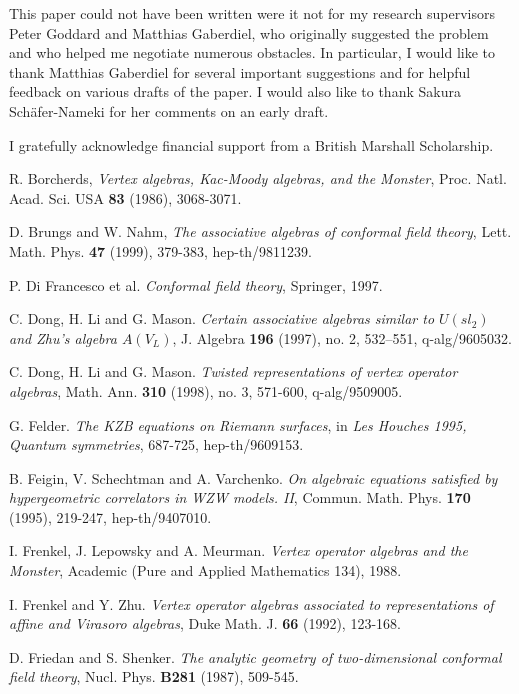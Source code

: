 \documentclass[a4paper,12pt]{article}
\newcommand{\ti}[1]{\textit{#1}}
\begin{document}
This paper could not have been written were it not for my research supervisors Peter Goddard and Matthias Gaberdiel,
who originally suggested the problem and who helped me negotiate numerous obstacles.  In particular, I would like to thank
Matthias Gaberdiel for several important suggestions and for helpful feedback on various drafts of the paper.  I would
also like to thank Sakura Sch\"afer-Nameki for her comments on an early draft.

I gratefully acknowledge financial support from a British Marshall Scholarship.


\begin{thebibliography}{99}

 R. Borcherds, \ti{Vertex algebras, Kac-Moody algebras, and the Monster},
Proc. Natl. Acad. Sci. USA \textbf{83} (1986), 3068-3071.

 D. Brungs and W. Nahm, \ti{The associative algebras of conformal field theory}, Lett. Math. Phys. \textbf{47} (1999), 379-383, hep-th/9811239.

 P. Di Francesco et al.  \ti{Conformal field theory}, Springer, 1997.

 C. Dong, H. Li and G. Mason.  \ti{Certain associative algebras similar to $U(sl_{2})$ and Zhu's algebra $A(V_{L})$}, J. Algebra \textbf{196} (1997), no. 2, 532--551, q-alg/9605032.

 C. Dong, H. Li and G. Mason.  \ti{Twisted representations of vertex operator algebras}, Math. Ann. \textbf{310} (1998), no. 3, 571-600, q-alg/9509005.

 G. Felder.  \ti{The KZB equations on Riemann surfaces}, in \ti{Les Houches 1995, Quantum symmetries}, 687-725, hep-th/9609153.

 B. Feigin, V. Schechtman and A. Varchenko.  \ti{On algebraic equations satisfied by hypergeometric
correlators in WZW models. II}, Commun. Math. Phys. \textbf{170} (1995), 219-247, hep-th/9407010.

 I. Frenkel, J. Lepowsky and A. Meurman.  \ti{Vertex operator algebras and the Monster}, Academic (Pure and Applied Mathematics 134), 1988. 

 I. Frenkel and Y. Zhu.  \ti{Vertex operator algebras associated to representations of affine and Virasoro algebras}, Duke Math. J. \textbf{66} (1992), 123-168.

 D. Friedan and S. Shenker.  \ti{The analytic geometry of two-dimensional conformal field theory}, Nucl. Phys. \textbf{B281} (1987), 509-545.


\end{thebibliography}
\end{document}
